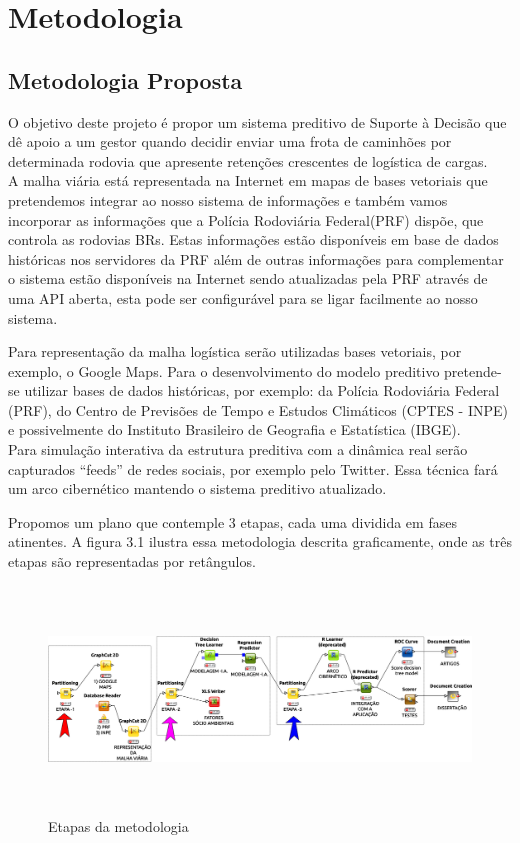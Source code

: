 \chapter{Metodologia}\label{meto}


\section{Metodologia Proposta}\label{intro:metodologia}

O objetivo deste projeto é propor um sistema preditivo de Suporte à Decisão que dê apoio a um gestor  quando decidir enviar uma frota de caminhões por determinada rodovia que apresente retenções crescentes 
de logística de cargas.\\

A malha viária está representada na Internet em mapas de bases vetoriais que pretendemos integrar ao nosso sistema de informações e também vamos incorporar as informações que a Polícia Rodoviária Federal(PRF) dispõe, que controla as rodovias BRs. Estas informações estão disponíveis em base de dados históricas nos servidores da PRF além de outras informações para complementar o sistema estão disponíveis na Internet sendo atualizadas pela PRF através de uma API aberta, esta pode ser configurável para se ligar facilmente ao nosso sistema. 

Para representação da malha logística serão utilizadas bases vetoriais, por exemplo, o Google Maps.
Para o desenvolvimento do modelo preditivo pretende-se utilizar bases de dados históricas, por exemplo: da Polícia Rodoviária Federal (PRF), do Centro de Previsões de Tempo e Estudos Climáticos (CPTES - INPE) e possivelmente do Instituto Brasileiro de Geografia e Estatística (IBGE).\\

Para simulação interativa da estrutura preditiva com a dinâmica real serão capturados ``feeds'' de redes sociais, por exemplo pelo Twitter. Essa técnica fará um arco cibernético mantendo o sistema preditivo atualizado.

Propomos um plano que contemple 3 etapas, cada uma dividida em fases atinentes. A figura 3.1 ilustra essa metodologia descrita graficamente, onde as três etapas são representadas por retângulos.
 
\begin{figure}[ht]
\centering
\caption{Etapas da metodologia}
\includegraphics[width=150mm, height=60mm]{Figuras/BigData/Etapas.png}
\end{figure}

